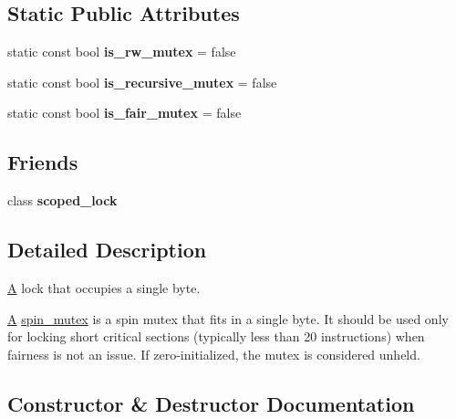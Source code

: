 \subsection*{Static Public Attributes}
\begin{DoxyCompactItemize}
\item 
\hypertarget{classtbb_1_1spin__mutex_a7c3354db4bd5cc81bccee9f249abb9e8}{}static const bool {\bfseries is\+\_\+rw\+\_\+mutex} = false\label{classtbb_1_1spin__mutex_a7c3354db4bd5cc81bccee9f249abb9e8}

\item 
\hypertarget{classtbb_1_1spin__mutex_a0cae048c5dc5deffe75464e4a3a2b752}{}static const bool {\bfseries is\+\_\+recursive\+\_\+mutex} = false\label{classtbb_1_1spin__mutex_a0cae048c5dc5deffe75464e4a3a2b752}

\item 
\hypertarget{classtbb_1_1spin__mutex_ad00ec9a97f34c9160300950b36deac3e}{}static const bool {\bfseries is\+\_\+fair\+\_\+mutex} = false\label{classtbb_1_1spin__mutex_ad00ec9a97f34c9160300950b36deac3e}

\end{DoxyCompactItemize}
\subsection*{Friends}
\begin{DoxyCompactItemize}
\item 
\hypertarget{classtbb_1_1spin__mutex_afcf922650b2fd9d76b7b939d8511bbd8}{}class {\bfseries scoped\+\_\+lock}\label{classtbb_1_1spin__mutex_afcf922650b2fd9d76b7b939d8511bbd8}

\end{DoxyCompactItemize}


\subsection{Detailed Description}
\hyperlink{structA}{A} lock that occupies a single byte. 

\hyperlink{structA}{A} \hyperlink{classtbb_1_1spin__mutex}{spin\+\_\+mutex} is a spin mutex that fits in a single byte. It should be used only for locking short critical sections (typically less than 20 instructions) when fairness is not an issue. If zero-\/initialized, the mutex is considered unheld. 

\subsection{Constructor \& Destructor Documentation}
\hypertarget{classtbb_1_1spin__mutex_a6c96196965bf7df426311d282ad3c378}{}
